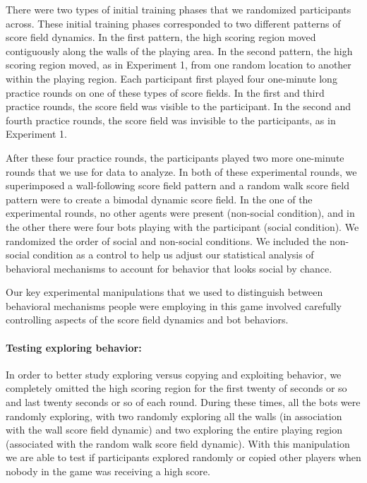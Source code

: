 \documentclass[12pt,letterpaper]{article}
\begin{document}
There were two types of initial training phases that we randomized participants across. These initial training phases corresponded to two different patterns of score field dynamics. In the first pattern, the high scoring region moved contiguously along the walls of the playing area. In the second pattern, the high scoring region moved, as in Experiment 1, from one random location to another within the playing region.  Each participant first played four one-minute long practice rounds on one of these types of score fields. In the first and third practice rounds, the score field was visible to the participant.   In the second and fourth practice rounds, the score field was invisible to the participants, as in Experiment 1.

After these four practice rounds, the participants played two more one-minute rounds that we use for data to analyze. In both of these experimental rounds, we superimposed a wall-following score field pattern and a random walk score field pattern were to create a bimodal dynamic score field. In the one of the experimental rounds, no other agents were present (non-social condition), and in the other there were four bots playing with the participant (social condition). We randomized the order of social and non-social conditions.  We included the non-social condition as a control to help us adjust our statistical analysis of behavioral mechanisms to account for behavior that looks social by chance. 


Our key experimental manipulations that we used to distinguish between behavioral mechanisms people were employing in this game involved carefully controlling aspects of the score field dynamics and bot behaviors. 

\paragraph{Testing exploring behavior:} In order to better study exploring versus copying and exploiting behavior, we completely omitted the high scoring region for the first twenty of seconds or so and last twenty seconds or so of each round. During these times, all the bots were randomly exploring, with two randomly exploring all the walls (in association with the wall score field dynamic) and two exploring the entire playing region (associated with the random walk score field dynamic).  With this manipulation we are able to test if participants explored randomly or copied other players when nobody in the game was receiving a high score. 
\end{document}
